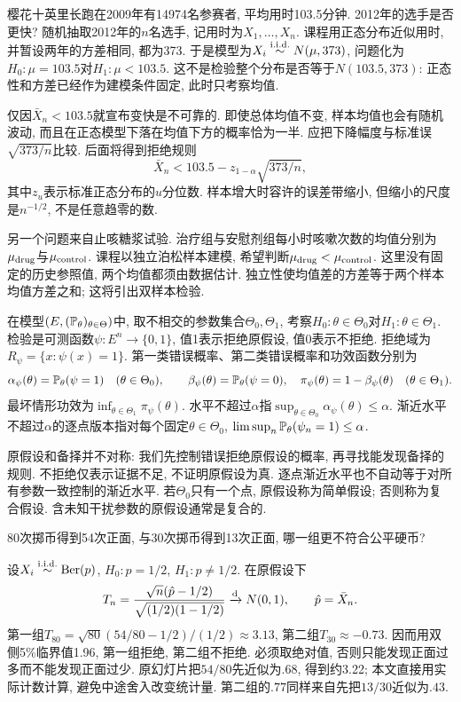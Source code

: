 樱花十英里长跑在2009年有14974名参赛者, 平均用时103.5分钟. 2012年的选手是否更快? 随机抽取2012年的$n$名选手, 记用时为$X_1,\ldots,X_n$. 课程用正态分布近似用时, 并暂设两年的方差相同, 都为373. 于是模型为$X_i\stackrel{\mathrm{i.i.d.}}{\sim} N(\mu,373)$, 问题化为$H_0:\mu=103.5$对$H_1:\mu<103.5$. 这不是检验整个分布是否等于$N(103.5,373)$: 正态性和方差已经作为建模条件固定, 此时只考察均值.

仅因$\bar X_n<103.5$就宣布变快是不可靠的. 即使总体均值不变, 样本均值也会有随机波动, 而且在正态模型下落在均值下方的概率恰为一半. 应把下降幅度与标准误$\sqrt{373/n}$比较. 后面将得到拒绝规则
\[
 \bar X_n<103.5-z_{1-\alpha}\sqrt{373/n},
\]
其中$z_u$表示标准正态分布的$u$分位数. 样本增大时容许的误差带缩小, 但缩小的尺度是$n^{-1/2}$, 不是任意趋零的数.

另一个问题来自止咳糖浆试验. 治疗组与安慰剂组每小时咳嗽次数的均值分别为$\mu_{\rm drug}$与$\mu_{\rm control}$. 课程以独立泊松样本建模, 希望判断$\mu_{\rm drug}<\mu_{\rm control}$. 这里没有固定的历史参照值, 两个均值都须由数据估计. 独立性使均值差的方差等于两个样本均值方差之和; 这将引出双样本检验.

\begin{definition}[检验与错误概率]
在模型$(E,(\mathbb P_\theta)_{\theta\in\Theta})$中, 取不相交的参数集合$\Theta_0,\Theta_1$, 考察$H_0:\theta\in\Theta_0$对$H_1:\theta\in\Theta_1$. 检验是可测函数$\psi:E^n\to\{0,1\}$, 值1表示拒绝原假设, 值0表示不拒绝. 拒绝域为$R_\psi=\{x:\psi(x)=1\}$. 第一类错误概率、第二类错误概率和功效函数分别为
\[
 \alpha_\psi(\theta)=\mathbb P_\theta(\psi=1)\quad(\theta\in\Theta_0),\qquad
 \beta_\psi(\theta)=\mathbb P_\theta(\psi=0),\quad
 \pi_\psi(\theta)=1-\beta_\psi(\theta)\quad(\theta\in\Theta_1).
\]
最坏情形功效为$\inf_{\theta\in\Theta_1}\pi_\psi(\theta)$. 水平不超过$\alpha$指$\sup_{\theta\in\Theta_0}\alpha_\psi(\theta)\leq\alpha$. 渐近水平不超过$\alpha$的逐点版本指对每个固定$\theta\in\Theta_0$, $\limsup_n\mathbb P_\theta(\psi_n=1)\leq\alpha$.
\end{definition}
原假设和备择并不对称: 我们先控制错误拒绝原假设的概率, 再寻找能发现备择的规则. 不拒绝仅表示证据不足, 不证明原假设为真. 逐点渐近水平也不自动等于对所有参数一致控制的渐近水平. 若$\Theta_0$只有一个点, 原假设称为简单假设; 否则称为复合假设. 含未知干扰参数的原假设通常是复合的.

\begin{example}
80次掷币得到54次正面, 与30次掷币得到13次正面, 哪一组更不符合公平硬币?
\end{example}
\begin{solution}
设$X_i\stackrel{\mathrm{i.i.d.}}{\sim}\operatorname{Ber}(p)$, $H_0:p=1/2$, $H_1:p\ne1/2$. 在原假设下
\[
 T_n=\frac{\sqrt n(\hat p-1/2)}{\sqrt{(1/2)(1-1/2)}}\xrightarrow{\mathrm d} N(0,1),\qquad\hat p=\bar X_n.
\]
第一组$T_{80}=\sqrt{80}(54/80-1/2)/(1/2)\approx3.13$, 第二组$T_{30}\approx-0.73$. 因而用双侧5\%临界值1.96, 第一组拒绝, 第二组不拒绝. 必须取绝对值, 否则只能发现正面过多而不能发现正面过少. 原幻灯片把$54/80$先近似为$.68$, 得到约3.22; 本文直接用实际计数计算, 避免中途舍入改变统计量. 第二组的$.77$同样来自先把$13/30$近似为$.43$.
\end{solution}

